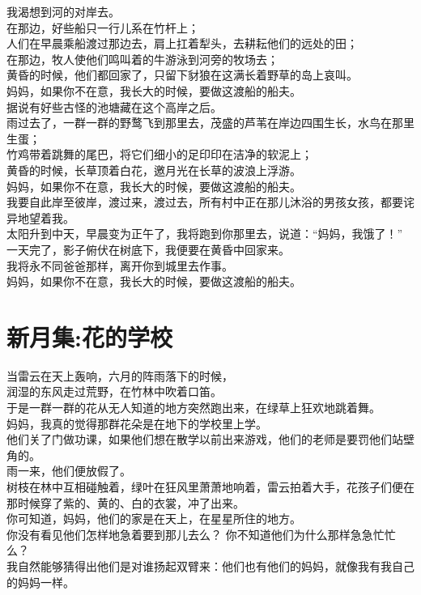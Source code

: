\documentclass[
]{book}
\renewenvironment{quote}{\begin{VF}}{\end{VF}}
\begin{document}
\begin{quote}
我渴想到河的对岸去。\\
在那边，好些船只一行儿系在竹杆上；\\
人们在早晨乘船渡过那边去，肩上扛着犁头，去耕耘他们的远处的田；\\
在那边，牧人使他们鸣叫着的牛游泳到河旁的牧场去；\\
黄昏的时候，他们都回家了，只留下豺狼在这满长着野草的岛上哀叫。\\
妈妈，如果你不在意，我长大的时候，要做这渡船的船夫。\\
据说有好些古怪的池塘藏在这个高岸之后。\\
雨过去了，一群一群的野鹜飞到那里去，茂盛的芦苇在岸边四围生长，水鸟在那里生蛋；\\
竹鸡带着跳舞的尾巴，将它们细小的足印印在洁净的软泥上；\\
黄昏的时候，长草顶着白花，邀月光在长草的波浪上浮游。\\
妈妈，如果你不在意，我长大的时候，要做这渡船的船夫。\\
我要自此岸至彼岸，渡过来，渡过去，所有村中正在那儿沐浴的男孩女孩，都要诧异地望着我。\\
太阳升到中天，早晨变为正午了，我将跑到你那里去，说道：``妈妈，我饿了！''\\
一天完了，影子俯伏在树底下，我便要在黄昏中回家来。\\
我将永不同爸爸那样，离开你到城里去作事。\\
妈妈，如果你不在意，我长大的时候，要做这渡船的船夫。
\end{quote}

\hypertarget{section-45}{%
\section{新月集:花的学校}\label{section-45}}

\begin{quote}
当雷云在天上轰响，六月的阵雨落下的时候，\\
润湿的东风走过荒野，在竹林中吹着口笛。\\
于是一群一群的花从无人知道的地方突然跑出来，在绿草上狂欢地跳着舞。\\
妈妈，我真的觉得那群花朵是在地下的学校里上学。\\
他们关了门做功课，如果他们想在散学以前出来游戏，他们的老师是要罚他们站壁角的。\\
雨一来，他们便放假了。\\
树枝在林中互相碰触着，绿叶在狂风里萧萧地响着，雷云拍着大手，花孩子们便在那时候穿了紫的、黄的、白的衣裳，冲了出来。\\
你可知道，妈妈，他们的家是在天上，在星星所住的地方。\\
你没有看见他们怎样地急着要到那儿去么？ 你不知道他们为什么那样急急忙忙么？\\
我自然能够猜得出他们是对谁扬起双臂来：他们也有他们的妈妈，就像我有我自己的妈妈一样。
\end{quote}
\end{document}
